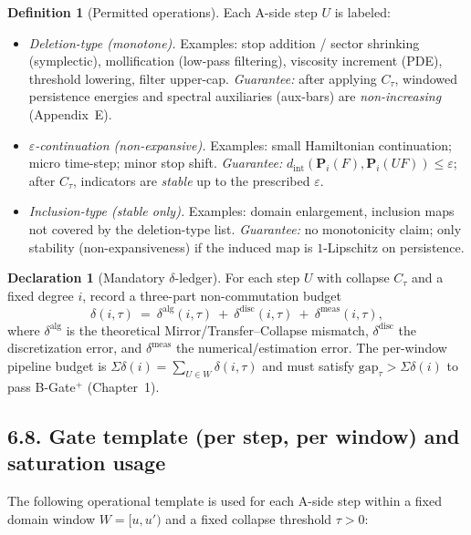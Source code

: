 \documentclass[11pt]{article}
\numberwithin{equation}{section}
\theoremstyle{plain}
\theoremstyle{definition}
\theoremstyle{remark}
\DeclareRobustCommand{\hyp}{\nobreakdash-}
\theoremstyle{plain}
\theoremstyle{definition}
\numberwithin{equation}{section}
\theoremstyle{definition}
\newtheorem{definition}[theorem]{Definition}
\newtheorem{declaration}[theorem]{Declaration}
\numberwithin{equation}{section}
\theoremstyle{plain}
\theoremstyle{definition}
\theoremstyle{remark}
\begin{document}
\begin{definition}[Permitted operations]\label{def:ops-catalog}
Each A\hyp side step $U$ is labeled:
\begin{itemize}
  \item \emph{Deletion\hyp type (monotone).} Examples: stop addition / sector shrinking (symplectic), mollification (low\hyp pass filtering), viscosity increment (PDE), threshold lowering, filter upper\hyp cap. \emph{Guarantee:} after applying $C_\tau$, windowed persistence energies and spectral auxiliaries (aux\hyp bars) are \emph{non\hyp increasing} (Appendix~E).
  \item \emph{$\varepsilon$-continuation (non\hyp expansive).} Examples: small Hamiltonian continuation; micro time\hyp step; minor stop shift. \emph{Guarantee:} $d_{\mathrm{int}}(\mathbf{P}_i(F),\mathbf{P}_i(UF))\le \varepsilon$; after $C_\tau$, indicators are \emph{stable} up to the prescribed $\varepsilon$.
  \item \emph{Inclusion\hyp type (stable only).} Examples: domain enlargement, inclusion maps not covered by the deletion\hyp type list. \emph{Guarantee:} no monotonicity claim; only stability (non\hyp expansiveness) if the induced map is $1$-Lipschitz on persistence.
\end{itemize}
\end{definition}

\begin{declaration}[Mandatory $\delta$-ledger]\label{dec:delta-ledger-ch6}
For each step $U$ with collapse $C_{\tau}$ and a fixed degree $i$, record a three\hyp part non\hyp commutation budget
\[
\delta(i,\tau)\ =\ \delta^{\mathrm{alg}}(i,\tau)\ +\ \delta^{\mathrm{disc}}(i,\tau)\ +\ \delta^{\mathrm{meas}}(i,\tau),
\]
where $\delta^{\mathrm{alg}}$ is the theoretical Mirror/Transfer–Collapse mismatch, $\delta^{\mathrm{disc}}$ the discretization error, and $\delta^{\mathrm{meas}}$ the numerical/estimation error. The per\hyp window pipeline budget is $\Sigma\delta(i)=\sum_{U\in W}\delta(i,\tau)$ and must satisfy $\mathrm{gap}_\tau>\Sigma\delta(i)$ to pass B\hyp Gate$^{+}$ (Chapter~1).
\end{declaration}

\subsection*{6.8. Gate template (per step, per window) and saturation usage}\label{subsec:gate-template}
The following operational template is used for each A\hyp side step within a fixed domain window $W=[u,u')$ and a fixed collapse threshold $\tau>0$:
\end{document}
